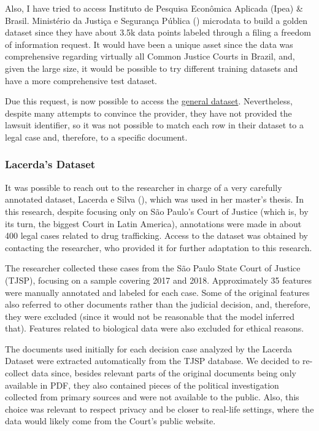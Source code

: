 \documentclass[
  12pt,
]{article}
\begin{document}
Also, I have tried to access Instituto de Pesquisa Econômica Aplicada
(Ipea) \& Brasil. Ministério da Justiça e Segurança Pública
()
microdata to build a golden dataset since they have about 3.5k data
points labeled through a filing a freedom of information request. It
would have been a unique asset since the data was comprehensive
regarding virtually all Common Justice Courts in Brazil, and, given the
large size, it would be possible to try different training datasets and
have a more comprehensive test dataset.

Due this request, is now possible to access the
\href{https://www.gov.br/mj/pt-br/assuntos/sua-protecao/politicas-sobre-drogas/pesquisa-e-informacao-3/pesquisa\%20IPEA/pesquisa-ipea-perfil-processado-e-producao-de-provas}{general
dataset}. Nevertheless, despite many attempts to convince the provider,
they have not provided the lawsuit identifier, so it was not possible to
match each row in their dataset to a legal case and, therefore, to a
specific document.

\subsubsection{Lacerda's Dataset}\label{lacerdas-dataset}

It was possible to reach out to the researcher in charge of a very
carefully annotated dataset, Lacerda e Silva
(), which was used in
her master's thesis. In this research, despite focusing only on São
Paulo's Court of Justice (which is, by its turn, the biggest Court in
Latin America), annotations were made in about 400 legal cases related
to drug trafficking. Access to the dataset was obtained by contacting
the researcher, who provided it for further adaptation to this research.

The researcher collected these cases from the São Paulo State Court of
Justice (TJSP), focusing on a sample covering 2017 and 2018.
Approximately 35 features were manually annotated and labeled for each
case. Some of the original features also referred to other documents
rather than the judicial decision, and, therefore, they were excluded
(since it would not be reasonable that the model inferred that).
Features related to biological data were also excluded for ethical
reasons.

The documents used initially for each decision case analyzed by the
Lacerda Dataset were extracted automatically from the TJSP database. We
decided to re-collect data since, besides relevant parts of the original
documents being only available in PDF, they also contained pieces of the
political investigation collected from primary sources and were not
available to the public. Also, this choice was relevant to respect
privacy and be closer to real-life settings, where the data would likely
come from the Court's public website.
\end{document}
